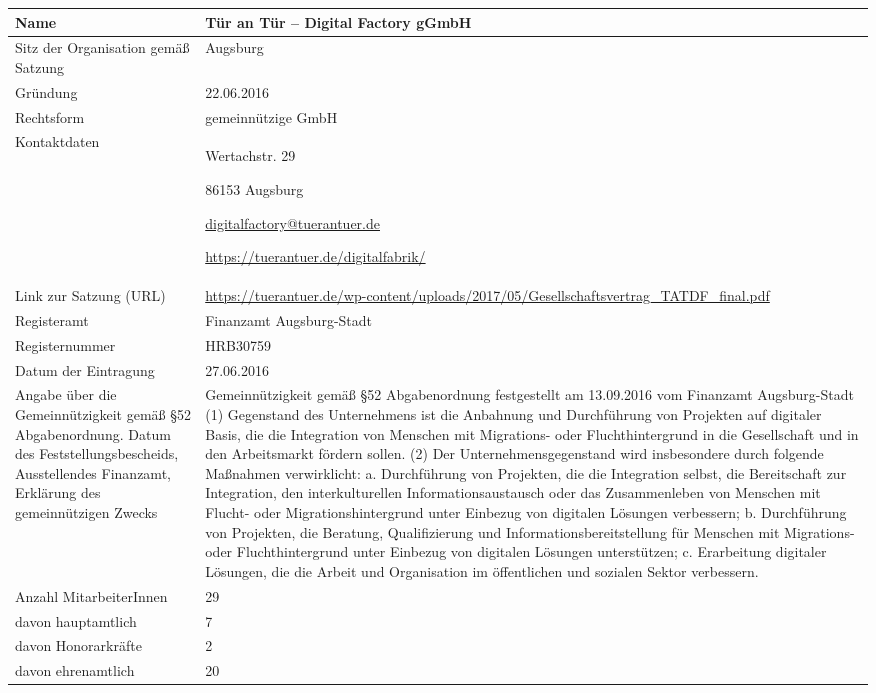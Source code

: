 \documentclass[12pt, a4paper]{article} %
\begin{document}
\begin{adjustwidth}{-1cm}{-1cm}
\begin{tabularx}{\textwidth+2cm}{p{5cm}X}
\toprule
Name & Tür an Tür – Digital Factory gGmbH\tabularnewline
\midrule
Sitz der Organisation gemäß Satzung & Augsburg\tabularnewline
\midrule
Gründung & 22.06.2016\tabularnewline
\midrule
Rechtsform & gemeinnützige GmbH\tabularnewline
\midrule
\begin{minipage}[t]{0.47\columnwidth}\raggedright
Kontaktdaten\strut
\end{minipage} & \begin{minipage}[t]{\columnwidth}
Wertachstr. 29

86153 Augsburg

\href{mailto:digitalfactory@tuerantuer.de}{\url{digitalfactory@tuerantuer.de}}

\url{https://tuerantuer.de/digitalfabrik/}
\end{minipage}\tabularnewline
\midrule
Link zur Satzung (URL) & \url{https://tuerantuer.de/wp-content/uploads/2017/05/Gesellschaftsvertrag\_TATDF\_final.pdf}\tabularnewline
\midrule
Registeramt & Finanzamt Augsburg-Stadt\tabularnewline
Registernummer & HRB30759\tabularnewline
Datum der Eintragung & 27.06.2016\tabularnewline
\midrule
Angabe über die Gemeinnützigkeit gemäß §52 Abgabenordnung. Datum des
Feststellungsbescheids, Ausstellendes Finanzamt, Erklärung des
gemeinnützigen Zwecks & Gemeinnützigkeit gemäß §52 Abgabenordnung
festgestellt am 13.09.2016 vom Finanzamt Augsburg-Stadt (1) Gegenstand
des Unternehmens ist die Anbahnung und Durchführung von Projekten auf
digitaler Basis, die die Integration von Menschen mit Migrations- oder
Fluchthintergrund in die Gesellschaft und in den Arbeitsmarkt fördern
sollen. (2) Der Unternehmensgegenstand wird insbesondere durch folgende
Maßnahmen verwirklicht: a. Durchführung von Projekten, die die
Integration selbst, die Bereitschaft zur Integration, den
interkulturellen Informationsaustausch oder das Zusammenleben von
Menschen mit Flucht- oder Migrationshintergrund unter Einbezug von
digitalen Lösungen verbessern; b. Durchführung von Projekten, die
Beratung, Qualifizierung und Informationsbereitstellung für Menschen mit
Migrations- oder Fluchthintergrund unter Einbezug von digitalen Lösungen
unterstützen; c. Erarbeitung digitaler Lösungen, die die Arbeit und
Organisation im öffentlichen und sozialen Sektor
verbessern.\tabularnewline
\midrule
Anzahl MitarbeiterInnen & 29 \tabularnewline
davon hauptamtlich & 7 \tabularnewline
davon Honorarkräfte & 2 \tabularnewline
davon ehrenamtlich & 20 \tabularnewline
\bottomrule
\end{tabularx}
\end{adjustwidth}
\end{document}
